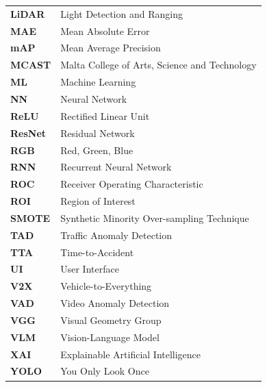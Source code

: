 \begin{longtable}{p{3cm} p{11cm}}
        \textbf{LiDAR} & Light Detection and Ranging \\
        \textbf{MAE} & Mean Absolute Error \\
        \textbf{mAP} & Mean Average Precision \\
        \textbf{MCAST} & Malta College of Arts, Science and Technology \\
        \textbf{ML} & Machine Learning \\
        \textbf{NN} & Neural Network \\
        \textbf{ReLU} & Rectified Linear Unit \\
        \textbf{ResNet} & Residual Network \\
        \textbf{RGB} & Red, Green, Blue \\
        \textbf{RNN} & Recurrent Neural Network \\
        \textbf{ROC} & Receiver Operating Characteristic \\
        \textbf{ROI} & Region of Interest \\
        \textbf{SMOTE} & Synthetic Minority Over-sampling Technique \\
        \textbf{TAD} & Traffic Anomaly Detection \\
        \textbf{TTA} & Time-to-Accident \\
        \textbf{UI} & User Interface \\
        \textbf{V2X} & Vehicle-to-Everything \\
        \textbf{VAD} & Video Anomaly Detection \\
        \textbf{VGG} & Visual Geometry Group \\
        \textbf{VLM} & Vision-Language Model \\
        \textbf{XAI} & Explainable Artificial Intelligence \\
        \textbf{YOLO} & You Only Look Once \\
\end{longtable}

\newpage
